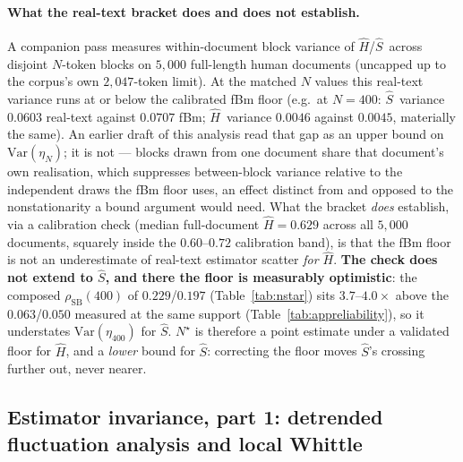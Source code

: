 \documentclass{article}
\newcommand{\Sest}{\ensuremath{\widehat{S}}}
\newcommand{\Hest}{\ensuremath{\widehat{H}}}
\begin{document}
\paragraph{What the real-text bracket does and does not establish.} A
companion pass measures within-document block variance of \Hest/\Sest\ across
disjoint $N$-token blocks on $5{,}000$ full-length human documents (uncapped up
to the corpus's own $2{,}047$-token limit). At the matched $N$ values this
real-text variance runs at or below the calibrated fBm floor (e.g.\ at $N=400$:
\Sest\ variance $0.0603$ real-text against $0.0707$ fBm; \Hest\ variance
$0.0046$ against $0.0045$, materially the same). An earlier draft of this
analysis read that gap as an upper bound on $\mathrm{Var}(\eta_N)$; it is not
--- blocks drawn from one document share that document's own realisation,
which suppresses between-block variance relative to the independent draws the
fBm floor uses, an effect distinct from and opposed to the nonstationarity a
bound argument would need. What the bracket \emph{does} establish, via a
calibration check (median full-document $\Hest=0.629$ across all $5{,}000$
documents, squarely inside the $0.60$--$0.72$ calibration band), is that the
fBm floor is not an underestimate of real-text estimator scatter \emph{for
\Hest}. \textbf{The check does not extend to \Sest, and there the floor is
measurably optimistic}: the composed $\rho_{\text{SB}}(400)$ of
$0.229$/$0.197$ (Table~\ref{tab:nstar}) sits $3.7$--$4.0\times$ above the
$0.063$/$0.050$ measured at the same support (Table~\ref{tab:appreliability}),
so it understates $\mathrm{Var}(\eta_{400})$ for \Sest. $N^{\star}$ is
therefore a point estimate under a validated floor for \Hest, and a
\emph{lower} bound for \Sest: correcting the floor moves \Sest's crossing
further out, never nearer.

\subsection{Estimator invariance, part 1: detrended fluctuation analysis and local Whittle}
\label{app:altestimators}
\end{document}
